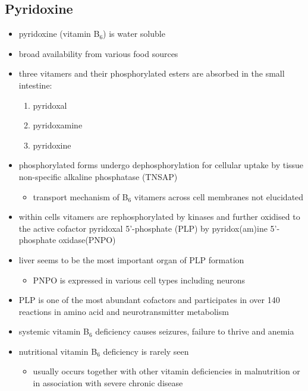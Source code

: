 \documentclass{scrartcl}
\begin{document}
\subsection{Pyridoxine}
\label{sec:org56ad966}
\begin{itemize}
\item pyridoxine (vitamin B\(_{\text{6}}\)) is water soluble
\item broad availability from various food sources
\item three vitamers and their phosphorylated esters are absorbed in the
small intestine:
\begin{enumerate}
\item pyridoxal
\item pyridoxamine
\item pyridoxine
\end{enumerate}

\item phosphorylated forms undergo dephosphorylation for cellular uptake
by tissue non-specific alkaline phosphatase (TNSAP)
\begin{itemize}
\item transport mechanism of B\(_{\text{6}}\) vitamers across cell membranes not
elucidated
\end{itemize}
\item within cells vitamers are rephosphorylated by kinases and further oxidised to the
active cofactor pyridoxal 5’-phosphate (PLP) by pyridox(am)ine
5’-phosphate oxidase(PNPO)
\item liver seems to be the most important organ of PLP formation
\begin{itemize}
\item PNPO is expressed in various cell types including neurons
\end{itemize}
\item PLP is one of the most abundant cofactors and participates in over
140 reactions in amino acid and neurotransmitter metabolism
\item systemic vitamin B\(_{\text{6}}\) deficiency causes seizures, failure to thrive
and anemia
\item nutritional vitamin B\(_{\text{6}}\) deficiency is rarely seen
\begin{itemize}
\item usually occurs together with other vitamin deficiencies in
malnutrition or in association with severe chronic disease
\end{itemize}
\end{itemize}
\end{document}
